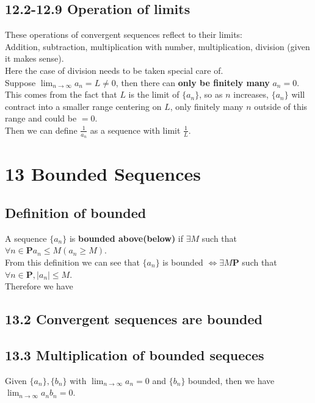 \documentclass{article}
\begin{document}
\subsection*{12.2-12.9  Operation of limits}
These operations of convergent sequences reflect to their limits:\\
Addition, subtraction, multiplication with number, multiplication, division (given it makes sense).\\
Here the case of division needs to be taken special care of.\\
Suppose $\lim_{n \rightarrow \infty}a_n = L \neq 0$, then there can \textbf{only be finitely many} $a_n = 0$.\\
This comes from the fact that $L$ is the limit of $\{a_n\}$, so as $n$ increases, $\{a_n\}$ will contract into a smaller range centering on $L$, only finitely many $n$ outside of this range and could be $=0$.\\
Then we can define $\frac{1}{a_n}$ as a sequence with limit $\frac{1}{L}$.
\section*{13 Bounded Sequences}
\subsection*{Definition of bounded}
A sequence $\{a_n\}$ is \textbf{bounded above(below)} if $\exists M$ such that $\forall n \in \mathbf{P} a_n \leq M(a_n \geq M)$.\\
From this definition we can see that $\{a_n\}$ is bounded $\iff \exists M \mathbf{P}$ such that $\forall n \in \mathbf{P}, |a_n| \leq M$.\\
Therefore we have
\subsection*{13.2 Convergent sequences are bounded}
\subsection*{13.3 Multiplication of bounded sequeces}
Given $\{a_n\}, \{b_n\}$ with $\lim_{n \rightarrow \infty}a_n = 0$ and $\{b_n\}$ bounded, then we have $\lim_{n \rightarrow \infty}a_nb_n = 0$.
\end{document}
